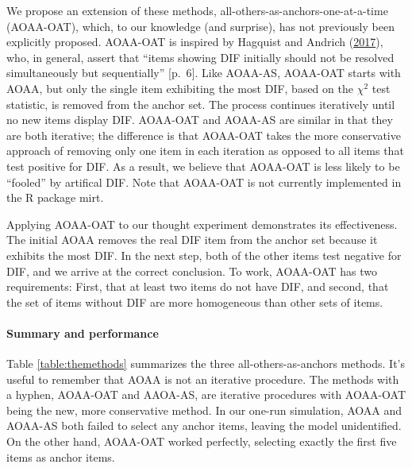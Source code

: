 \documentclass[
  11pt,
]{article}
\begin{document}
We propose an extension of these methods, all-others-as-anchors-one-at-a-time (AOAA-OAT), which, to our knowledge (and surprise), has not previously been explicitly proposed. AOAA-OAT is inspired by Hagquist and Andrich (\protect\hyperlink{ref-hagquist2017recent}{2017}), who, in general, assert that \enquote{items showing DIF initially should not be resolved simultaneously but sequentially} {[}p.~6{]}. Like AOAA-AS, AOAA-OAT starts with AOAA, but only the single item exhibiting the most DIF, based on the \(\chi^2\) test statistic, is removed from the anchor set. The process continues iteratively until no new items display DIF. AOAA-OAT and AOAA-AS are similar in that they are both iterative; the difference is that AOAA-OAT takes the more conservative approach of removing only one item in each iteration as opposed to all items that test positive for DIF. As a result, we believe that AOAA-OAT is less likely to be \enquote{fooled} by artifical DIF. Note that AOAA-OAT is not currently implemented in the R package mirt.

Applying AOAA-OAT to our thought experiment demonstrates its effectiveness. The initial AOAA removes the real DIF item from the anchor set because it exhibits the most DIF. In the next step, both of the other items test negative for DIF, and we arrive at the correct conclusion. To work, AOAA-OAT has two requirements: First, that at least two items do not have DIF, and second, that the set of items without DIF are more homogeneous than other sets of items.

\hypertarget{summary-and-performance}{%
\paragraph{Summary and performance}\label{summary-and-performance}}

Table \ref{table:themethods} summarizes the three all-others-as-anchors methods. It's useful to remember that AOAA is not an iterative procedure. The methods with a hyphen, AOAA-OAT and AAOA-AS, are iterative procedures with AOAA-OAT being the new, more conservative method. In our one-run simulation, AOAA and AOAA-AS both failed to select any anchor items, leaving the model unidentified. On the other hand, AOAA-OAT worked perfectly, selecting exactly the first five items as anchor items.
\end{document}
